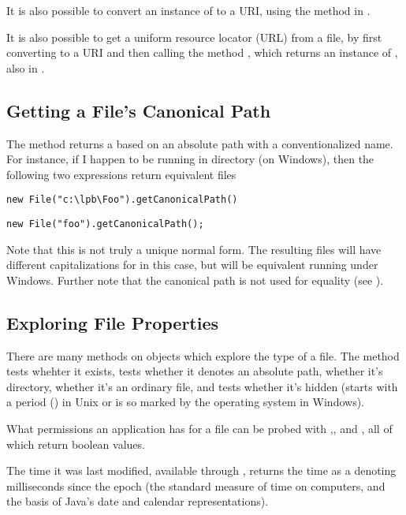 It is also possible to convert an instance of  to a URI,
using the method  in .  

It is also possible to get a uniform resource locator (URL) from a
file, by first converting to a URI and then calling the 
method , which returns an instance of , also
in .



\subsection{Getting a File's Canonical Path}

The method  returns a  based on an
absolute path with a conventionalized name.  For instance, if I happen
to be running in directory  (on Windows), then the
following two expressions return equivalent files
%
\begin{verbatim}
new File("c:\lpb\Foo").getCanonicalPath()
\end{verbatim}
%
%
\begin{verbatim}
new File("foo").getCanonicalPath();
\end{verbatim}
%
Note that this is not truly a unique normal form.  The resulting files
will have different capitalizations for  in this case, but
will be equivalent running under Windows.  Further note that the
canonical path is not used for equality (see ).


\subsection{Exploring File Properties}

There are many methods on  objects which explore the type
of a file.  The method  tests whehter it exists,
 tests whether it
denotes an absolute path,  whether it's directory,
 whether it's an ordinary file, and
 tests whether it's hidden (starts with a period () in
Unix or is so marked by the operating system in Windows).

What permissions an application has for a file can be probed with
,, and , all of
which return boolean values.

The time it was last modified, available through
, returns the time as a  denoting
milliseconds since the epoch (the standard measure of time on
computers, and the basis of Java's date and calendar representations).

